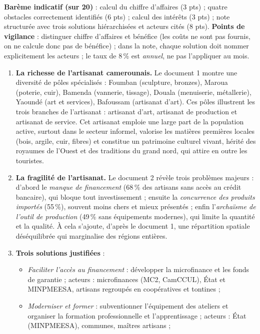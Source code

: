 \documentclass[11pt]{article}
\begin{document}
\begin{corrige}
\begin{enumerate}
\end{enumerate}
\textbf{Barème indicatif (sur 20)} : calcul du chiffre d'affaires (3 pts) ; quatre obstacles correctement identifiés (6 pts) ; calcul des intérêts (3 pts) ; note structurée avec trois solutions hiérarchisées et acteurs cités (8 pts).
\textbf{Points de vigilance} : distinguer chiffre d'affaires et bénéfice (les coûts ne sont pas fournis, on ne calcule donc pas de bénéfice) ; dans la note, chaque solution doit nommer explicitement les acteurs ; le taux de 8\,\% est \emph{annuel}, ne pas l'appliquer au mois.
\end{corrige}

\begin{corrige}
\begin{enumerate}
\item \textbf{La richesse de l'artisanat camerounais.} Le document 1 montre une diversité de pôles spécialisés : Foumban (sculpture, bronzes), Maroua (poterie, cuir), Bamenda (vannerie, tissage), Douala (menuiserie, métallerie), Yaoundé (art et services), Bafoussam (artisanat d'art). Ces pôles illustrent les trois branches de l'artisanat : artisanat d'art, artisanat de production et artisanat de service. Cet artisanat emploie une large part de la population active, surtout dans le secteur informel, valorise les matières premières locales (bois, argile, cuir, fibres) et constitue un patrimoine culturel vivant, hérité des royaumes de l'Ouest et des traditions du grand nord, qui attire en outre les touristes.
\item \textbf{La fragilité de l'artisanat.} Le document 2 révèle trois problèmes majeurs : d'abord le \emph{manque de financement} (68\,\% des artisans sans accès au crédit bancaire), qui bloque tout investissement ; ensuite la \emph{concurrence des produits importés} (55\,\%), souvent moins chers et mieux présentés ; enfin l'\emph{archaïsme de l'outil de production} (49\,\% sans équipements modernes), qui limite la quantité et la qualité. À cela s'ajoute, d'après le document 1, une répartition spatiale déséquilibrée qui marginalise des régions entières.
\item \textbf{Trois solutions justifiées} :
\begin{itemize}
\item \emph{Faciliter l'accès au financement} : développer la microfinance et les fonds de garantie ; acteurs : microfinances (MC2, CamCCUL), État et MINPMEESA, artisans regroupés en coopératives et tontines ;
\item \emph{Moderniser et former} : subventionner l'équipement des ateliers et organiser la formation professionnelle et l'apprentissage ; acteurs : État (MINPMEESA), communes, maîtres artisans ;

\end{itemize}
\end{enumerate}
\end{corrige}
\end{document}
